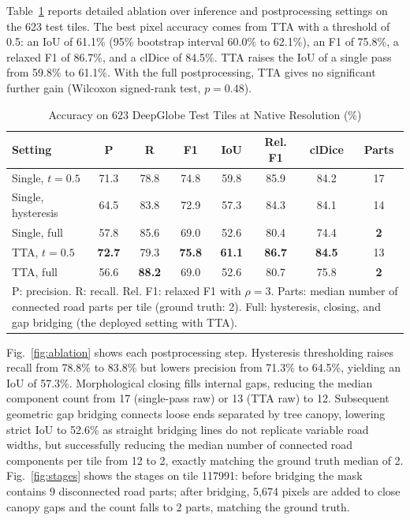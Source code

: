 \documentclass{ieeeaccess}
\begin{document}
Table~\ref{tab:acc} reports detailed ablation over inference and postprocessing settings on the 623 test tiles. The best pixel accuracy comes from TTA with a threshold of 0.5: an IoU of 61.1\% (95\% bootstrap interval 60.0\% to 62.1\%), an F1 of 75.8\%, a relaxed F1 of 86.7\%, and a clDice of 84.5\%. TTA raises the IoU of a single pass from 59.8\% to 61.1\%. With the full postprocessing, TTA gives no significant further gain (Wilcoxon signed-rank test, $p = 0.48$).

\begin{table}[t]
\caption{Accuracy on 623 DeepGlobe Test Tiles at Native Resolution (\%)}
\label{tab:acc}
\setlength{\tabcolsep}{2pt}
\tablebodyfont
\begin{tabular}{|l|c|c|c|c|c|c|c|}
\hline
Setting & P & R & F1 & IoU & Rel. F1 & clDice & Parts \\
\hline
Single, $t = 0.5$ & 71.3 & 78.8 & 74.8 & 59.8 & 85.9 & 84.2 & 17 \\
Single, hysteresis & 64.5 & 83.8 & 72.9 & 57.3 & 84.3 & 84.1 & 14 \\
Single, full & 57.8 & 85.6 & 69.0 & 52.6 & 80.4 & 74.4 & \textbf{2} \\
TTA, $t = 0.5$ & \textbf{72.7} & 79.3 & \textbf{75.8} & \textbf{61.1} & \textbf{86.7} & \textbf{84.5} & 13 \\
TTA, full & 56.6 & \textbf{88.2} & 69.0 & 52.6 & 80.7 & 75.8 & \textbf{2} \\
\hline
\multicolumn{8}{p{232pt}}{P: precision. R: recall. Rel. F1: relaxed F1 with $\rho = 3$. Parts: median number of connected road parts per tile (ground truth: 2). Full: hysteresis, closing, and gap bridging (the deployed setting with TTA).}
\end{tabular}
\end{table}

Fig.~\ref{fig:ablation} shows each postprocessing step. Hysteresis thresholding raises recall from 78.8\% to 83.8\% but lowers precision from 71.3\% to 64.5\%, yielding an IoU of 57.3\%. Morphological closing fills internal gaps, reducing the median component count from 17 (single-pass raw) or 13 (TTA raw) to 12. Subsequent geometric gap bridging connects loose ends separated by tree canopy, lowering strict IoU to 52.6\% as straight bridging lines do not replicate variable road widths, but successfully reducing the median number of connected road components per tile from 12 to 2, exactly matching the ground truth median of 2. Fig.~\ref{fig:stages} shows the stages on tile 117991: before bridging the mask contains 9 disconnected road parts; after bridging, 5,674 pixels are added to close canopy gaps and the count falls to 2 parts, matching the ground truth.
\end{document}
